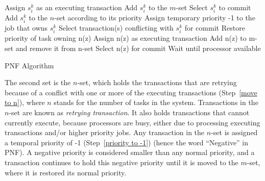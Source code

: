 \documentclass[twocolumn]{article}
\begin{document}
\begin{algorithm}[h]
\footnotesize{
\LinesNumbered
{}
{
Assign $s_i^k$ as an executing transaction\;
Add $s_i^k$ to the $m$-set\;
Select $s_i^k$ to commit
}
{
Add $s_i^k$ to the $n$-set according to its priority\label{move to n}\;
Assign temporary priority -1 to the job that owns $s_i^k$ \label{priority to -1}\;
Select transaction(s) conflicting with $s_i^k$ for commit\label{s_i^k commit}\;
}
{
	{
		{
			{
				Restore priority of task owning n(z)\;
				Assign n(z) as executing transaction\;
				Add n(z) to m-set and remove it from n-set\;
				Select n(z) for commit\;
			}
			{
				Wait until processor available
			}
		}
	}
}
}
\caption{PNF Algorithm} \label{PNF-algorithm}
\end{algorithm}


The second set is the $n$-set, which holds the transactions
that are retrying because of a conflict with one or more of the executing
transactions (Step~\ref{move to n}), where $n$ stands for
the number of tasks in the system. Transactions in the $n$-set are known as \emph{retrying transaction}. It also holds transactions that
cannot currently execute, because processors are busy, either due to processing executing transactions
and/or higher priority jobs. Any transaction in the $n$-set is assigned a temporal
priority of -1 (Step~\ref{priority to -1}) (hence the word 
``Negative'' in PNF). A negative priority
is considered smaller than any normal priority, and a transaction
continues to hold this negative priority until it is moved to the $m$-set, where it is restored its normal priority.
\end{document}
